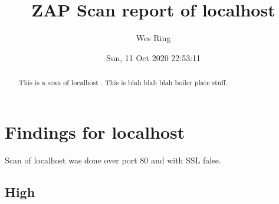 \documentclass[10pt]{article}
\title{ZAP Scan report of localhost}
\author{Wes Ring}
\date{Sun, 11 Oct 2020 22:53:11}
\begin{document}
\null  %
\nointerlineskip  %
\vfill
\let\snewpage \newpage
\let\newpage \relax
\maketitle
\let \newpage \snewpage
\vfill 
\newpage

{\hypersetup{linktoc=all,hidelinks}
\tableofcontents
}

\newpage
\begin{abstract}
This is a scan of localhost
. This is blah blah blah boiler plate stuff.
\end{abstract}
\section{Findings for localhost}
Scan of localhost was done over port 80 and with SSL false.
\subsection{High}
\end{document}
